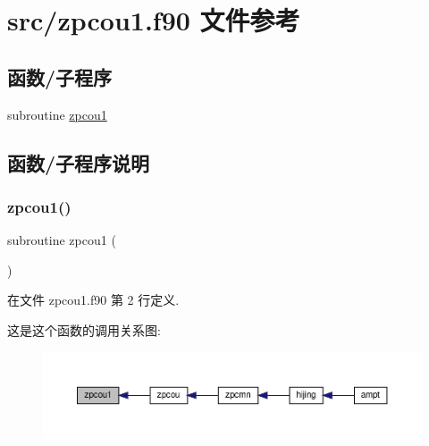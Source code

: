 \hypertarget{zpcou1_8f90}{}\section{src/zpcou1.f90 文件参考}
\label{zpcou1_8f90}
\subsection*{函数/子程序}
\begin{DoxyCompactItemize}
\item 
subroutine \mbox{\hyperlink{zpcou1_8f90_aa71a5904db0edae21d92bc27a737ea4a}{zpcou1}}
\end{DoxyCompactItemize}


\subsection{函数/子程序说明}
\mbox{\label{zpcou1_8f90_aa71a5904db0edae21d92bc27a737ea4a}} 
\subsubsection{\texorpdfstring{zpcou1()}{zpcou1()}}
{\footnotesize\ttfamily subroutine zpcou1 (\begin{DoxyParamCaption}{ }\end{DoxyParamCaption})}



在文件 zpcou1.\+f90 第 2 行定义.

这是这个函数的调用关系图\+:
\nopagebreak
\begin{figure}[H]
\begin{center}
\leavevmode
\includegraphics[width=350pt]{zpcou1_8f90_aa71a5904db0edae21d92bc27a737ea4a_icgraph}
\end{center}
\end{figure}
